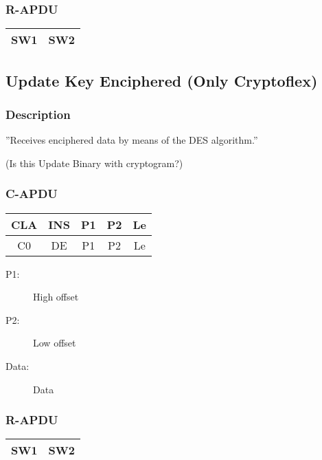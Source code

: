 \documentclass[a4paper,oneside]{article}
\begin{document}
\subsubsection*{R-APDU}

\begin{tabular}{|c|c|} \hline
SW1 & SW2 \\ \hline
\end{tabular}


\subsection{Update Key Enciphered (Only Cryptoflex)}

\subsubsection*{Description}

''Receives enciphered data by means of the DES algorithm.''

(Is this Update Binary with cryptogram?)

\subsubsection*{C-APDU}

\begin{tabular}{|c|c|c|c|c|} \hline
CLA & INS & P1 & P2 & Le \\ \hline \hline
C0 & DE & P1 & P2 & Le \\ \hline
\end{tabular}

\begin{description}
\item[P1:] High offset
\item[P2:] Low offset
\item[Data:] Data
\end{description}

\subsubsection*{R-APDU}

\begin{tabular}{|c|c|} \hline
SW1 & SW2 \\ \hline
\end{tabular}

\end{document}
